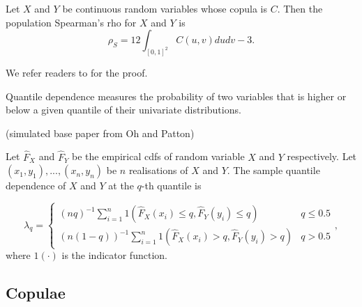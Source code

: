   \begin{theo}
    Let $X$ and $Y$ be continuous random variables whose copula is $C$. 
    Then the population Spearman's rho for $X$ and $Y$ is 
    \[\rho_S = 12\int_{[0,1]^2}C(u,v)dudv-3. \]
  \end{theo}

We refer readers to \citet[section 2.12.2]{joe1997multivariate} for the proof. 

Quantile dependence measures the probability of two variables that is higher or below a given quantile of their univariate distributions.

(simulated base paper from Oh and Patton)
\begin{defi} 
  Let $\hat F_X$ and $\hat F_Y$ be the empirical cdfs of random variable $X$ and $Y$ respectively.
  Let $(x_1, y_1),...,(x_n, y_n)$ be $n$ realisations of $X$ and $Y$. 
  The sample quantile dependence of $X$ and $Y$ at the $q$-th quantile is 

  \begin{equation*}
    \lambda_q = \begin{cases}
      (nq)^{-1}\sum_{i=1}^n 1\left( 
        \hat F_X(x_i) \leq q, \hat F_Y(y_i) \leq q 
      \right) & q \leq 0.5 \\
      (n(1-q))^{-1}\sum_{i=1}^n 1\left( 
        \hat F_X(x_i) > q, \hat  F_Y(y_i) > q 
      \right) & q > 0.5 
    \end{cases},
  \end{equation*}
  where $1(\cdot)$ is the indicator function. 

\end{defi}

\subsection{Copulae}\label{subsec:copulae}

